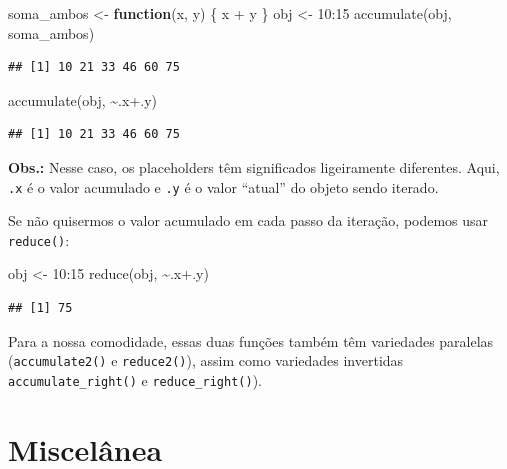 \documentclass[
]{book}
\newenvironment{Shaded}{\begin{snugshade}}{\end{snugshade}}
\newcommand{\ControlFlowTok}[1]{\textcolor[rgb]{0.13,0.29,0.53}{\textbf{#1}}}
\newcommand{\DecValTok}[1]{\textcolor[rgb]{0.00,0.00,0.81}{#1}}
\newcommand{\FunctionTok}[1]{\textcolor[rgb]{0.00,0.00,0.00}{#1}}
\newcommand{\NormalTok}[1]{#1}
\newcommand{\OtherTok}[1]{\textcolor[rgb]{0.56,0.35,0.01}{#1}}
\newcommand{\SpecialCharTok}[1]{\textcolor[rgb]{0.00,0.00,0.00}{#1}}
\begin{document}
\begin{Shaded}
\begin{Highlighting}[]
\NormalTok{soma\_ambos }\OtherTok{\textless{}{-}} \ControlFlowTok{function}\NormalTok{(x, y) \{ x }\SpecialCharTok{+}\NormalTok{ y \}}
\NormalTok{obj }\OtherTok{\textless{}{-}} \DecValTok{10}\SpecialCharTok{:}\DecValTok{15}
\FunctionTok{accumulate}\NormalTok{(obj, soma\_ambos)}
\end{Highlighting}
\end{Shaded}

\begin{verbatim}
## [1] 10 21 33 46 60 75
\end{verbatim}

\begin{Shaded}
\begin{Highlighting}[]
\FunctionTok{accumulate}\NormalTok{(obj, }\SpecialCharTok{\textasciitilde{}}\NormalTok{.x}\SpecialCharTok{+}\NormalTok{.y)}
\end{Highlighting}
\end{Shaded}

\begin{verbatim}
## [1] 10 21 33 46 60 75
\end{verbatim}

\textbf{Obs.:} Nesse caso, os placeholders têm significados ligeiramente diferentes.
Aqui, \texttt{.x} é o valor acumulado e \texttt{.y} é o valor ``atual'' do objeto sendo iterado.

Se não quisermos o valor acumulado em cada passo da iteração, podemos usar
\texttt{reduce()}:

\begin{Shaded}
\begin{Highlighting}[]
\NormalTok{obj }\OtherTok{\textless{}{-}} \DecValTok{10}\SpecialCharTok{:}\DecValTok{15}
\FunctionTok{reduce}\NormalTok{(obj, }\SpecialCharTok{\textasciitilde{}}\NormalTok{.x}\SpecialCharTok{+}\NormalTok{.y)}
\end{Highlighting}
\end{Shaded}

\begin{verbatim}
## [1] 75
\end{verbatim}

Para a nossa comodidade, essas duas funções também têm variedades paralelas
(\texttt{accumulate2()} e \texttt{reduce2()}), assim como variedades invertidas
\texttt{accumulate\_right()} e \texttt{reduce\_right()}).

\hypertarget{misceluxe2nea-1}{%
\section{Miscelânea}\label{misceluxe2nea-1}}
\end{document}
